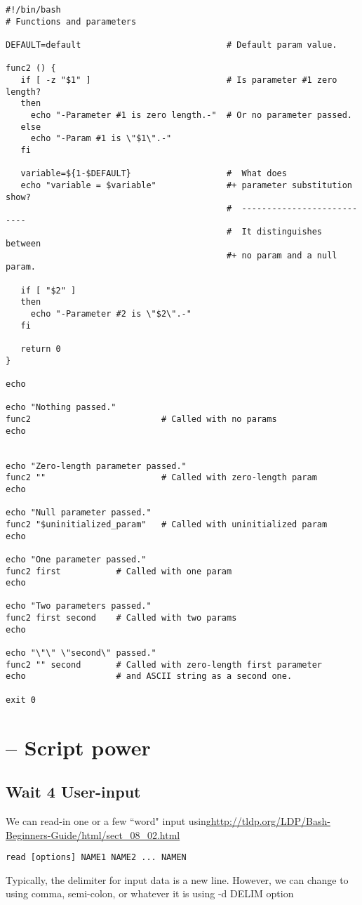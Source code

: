 \begin{verbatim}
#!/bin/bash
# Functions and parameters

DEFAULT=default                             # Default param value.

func2 () {
   if [ -z "$1" ]                           # Is parameter #1 zero length?
   then
     echo "-Parameter #1 is zero length.-"  # Or no parameter passed.
   else
     echo "-Param #1 is \"$1\".-"
   fi

   variable=${1-$DEFAULT}                   #  What does
   echo "variable = $variable"              #+ parameter substitution show?
                                            #  ---------------------------
                                            #  It distinguishes between
                                            #+ no param and a null param.

   if [ "$2" ]
   then
     echo "-Parameter #2 is \"$2\".-"
   fi

   return 0
}

echo
   
echo "Nothing passed."   
func2                          # Called with no params
echo


echo "Zero-length parameter passed."
func2 ""                       # Called with zero-length param
echo

echo "Null parameter passed."
func2 "$uninitialized_param"   # Called with uninitialized param
echo

echo "One parameter passed."   
func2 first           # Called with one param
echo

echo "Two parameters passed."   
func2 first second    # Called with two params
echo

echo "\"\" \"second\" passed."
func2 "" second       # Called with zero-length first parameter
echo                  # and ASCII string as a second one.

exit 0
\end{verbatim}

\section{-- Script power}

\subsection{Wait 4 User-input}
\label{sec:User_input}

We can
read-in one
or a few
``word" input
using\url{http://tldp.org/LDP/Bash-Beginners-Guide/html/sect_08_02.html}
\begin{verbatim}
read [options] NAME1 NAME2 ... NAMEN
\end{verbatim}
Typically, the delimiter for input data is a new line. However, we can change to
using comma, semi-colon, or whatever it is using -d DELIM option


